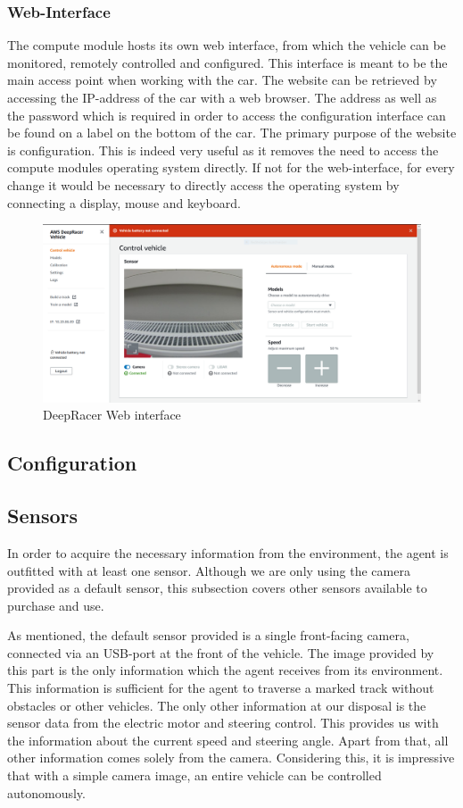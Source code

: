 \subsubsection{Web-Interface}
The compute module hosts its own web interface, from which the vehicle can be monitored, remotely controlled and configured. This interface is meant to be the main access point when working with the car. The website can be retrieved by accessing the IP-address of the car with a web browser. The address as well as the password which is required in order to access the configuration interface can be found on a label on the bottom of the car. The primary purpose of the website is configuration. This is indeed very useful as it removes the need to access the compute modules operating system directly. If not for the web-interface, for every change it would be necessary to directly access the operating system by connecting a display, mouse and keyboard.

\begin{figure}
    \centering
    \includegraphics[width=.85\textwidth]{images/deepracer_console_1.png}
    \caption{DeepRacer Web interface}
    \label{fig:web_interface}
\end{figure}

\subsection{Configuration}

\subsection{Sensors}
In order to acquire the necessary information from the environment, the agent is outfitted with at least one sensor. Although we are only using the camera provided as a default sensor, this subsection covers other sensors available to purchase and use.

As mentioned, the default sensor provided is a single front-facing camera, connected via an USB-port at the front of the vehicle. The image provided by this part is the only information which the agent receives from its environment. This information is sufficient for the agent to traverse a marked track without obstacles or other vehicles. The only other information at our disposal is the sensor data from the electric motor and steering control. This provides us with the information about the current speed and steering angle. Apart from that, all other information comes solely from the camera. Considering this, it is impressive that with a simple camera image, an entire vehicle can be controlled autonomously.

